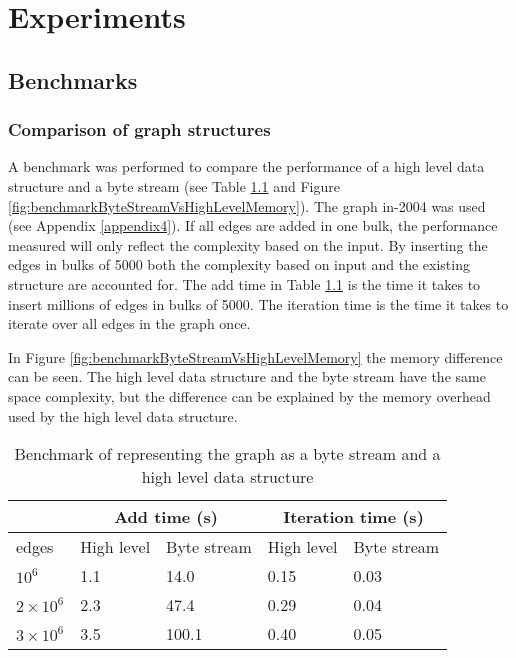 \chapter{Experiments}

\section{Benchmarks}

\subsection{Comparison of graph structures} \label{bench:graphStructure}
A benchmark was performed to compare the performance of a high level data structure and a byte stream (see Table \ref{table:byteStreamHighLevelTime} and Figure \ref{fig:benchmarkByteStreamVsHighLevelMemory}). The graph in-2004 was used (see Appendix \ref{appendix4}). If all edges are added in one bulk, the performance measured will only reflect the complexity based on the input. By inserting the edges in bulks of 5000 both the complexity based on input and the existing structure are accounted for. The add time in Table \ref{table:byteStreamHighLevelTime} is the time it takes to insert millions of edges in bulks of 5000. The iteration time is the time it takes to iterate over all edges in the graph once.

In Figure \ref{fig:benchmarkByteStreamVsHighLevelMemory} the memory difference can be seen. The high level data structure and the byte stream have the same space complexity, but the difference can be explained by the memory overhead used by the high level data structure. 

\begin{table}[h]
    \center
    \begin{tabular}{ | l | l | l | l | l |}
        \hline
            & \multicolumn{2}{c}{Add time (s)} \vline & \multicolumn{2}{c}{Iteration time (s)} \vline \\ \hline
        edges             & High level & Byte stream & High level & Byte stream \\ \hline
        $10^6$            & 1.1        & 14.0        & 0.15       & 0.03 \\ \hline
        $2 \times 10^6$   & 2.3        & 47.4        & 0.29       & 0.04 \\ \hline 
        $3 \times 10^6$   & 3.5        & 100.1       & 0.40       & 0.05 \\ \hline
    \end{tabular}
    \captionsetup{justification=centering}
    \caption{Benchmark of representing the graph as a byte stream and a high level data structure}
    \label{table:byteStreamHighLevelTime}
\end{table}

